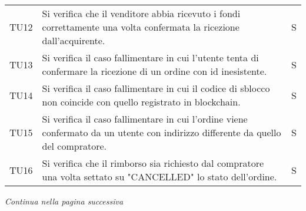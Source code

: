 \begin{table}[H]
\begin{tabular}{c|p{10cm}|c}
    TU12 & Si verifica che il venditore abbia ricevuto i fondi correttamente una volta confermata la ricezione dall'acquirente.              & S \\
    TU13 & Si verifica il caso fallimentare in cui l'utente tenta di confermare la ricezione di un ordine con id inesistente.                & S \\
    TU14 & Si verifica il caso fallimentare in cui il codice di sblocco non coincide con quello registrato in blockchain.                    & S \\
    TU15 & Si verifica il caso fallimentare in cui l'ordine viene confermato da un utente con indirizzo differente da quello del compratore. & S \\
    TU16 & Si verifica che il rimborso sia richiesto dal compratore una volta settato su "CANCELLED" lo stato dell'ordine.                   & S \\
  \end{tabular}
\end{table}
\begin{center}
  \textit{\small Continua nella pagina successiva}
\end{center}
